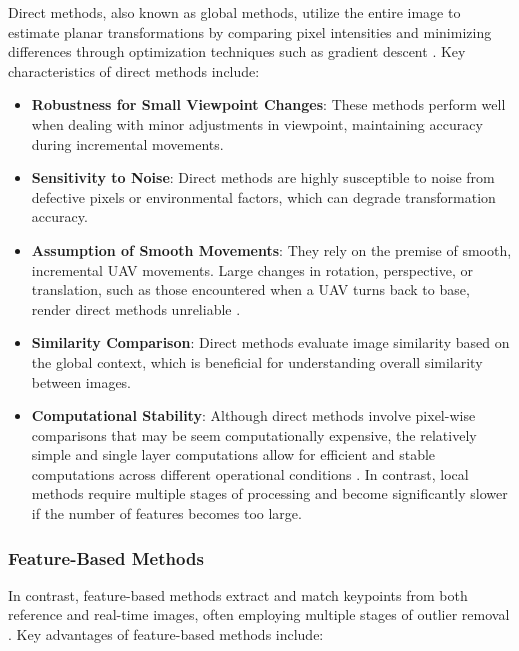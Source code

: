 Direct methods, also known as global methods, utilize the entire image to estimate planar transformations by comparing pixel intensities and minimizing differences through optimization techniques such as gradient descent \cite{nguyen2018}. Key characteristics of direct methods include:

\begin{itemize}
    \item \textbf{Robustness for Small Viewpoint Changes}: These methods perform well when dealing with minor adjustments in viewpoint, maintaining accuracy during incremental movements.
    \item \textbf{Sensitivity to Noise}: Direct methods are highly susceptible to noise from defective pixels or environmental factors, which can degrade transformation accuracy.
    \item \textbf{Assumption of Smooth Movements}: They rely on the premise of smooth, incremental UAV movements. Large changes in rotation, perspective, or translation, such as those encountered when a UAV turns back to base, render direct methods unreliable \cite{nguyen2018}.
    \item \textbf{Similarity Comparison}: Direct methods evaluate image similarity based on the global context, which is beneficial for understanding overall similarity between images.
    \item \textbf{Computational Stability}: Although direct methods involve pixel-wise comparisons that may be seem computationally expensive, the relatively simple and single layer computations allow for efficient and stable computations across different operational conditions \cite{nguyen2018}. In contrast, local methods require multiple stages of processing and become significantly slower if the number of features becomes too large.
\end{itemize}

\subsubsection{Feature-Based Methods}

In contrast, feature-based methods extract and match keypoints from both reference and real-time images, often employing multiple stages of outlier removal \cite{GlobalLocal2023}. Key advantages of feature-based methods include:

